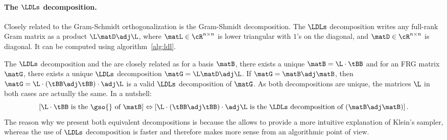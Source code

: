\paragraph{The $\LDLs$ decomposition.} Closely related to the Gram-Schmidt orthogonalization is the Gram-Shmidt decomposition. The $\LDLs$ decomposition writes any full-rank Gram matrix as a product $\L \matD \adj\L$, where $\matL \in \cR^{n\times n}$ is lower triangular with $1$'s on the diagonal, and $\matD \in \cR^{n\times n}$ is diagonal. It can be computed using algorithm~\ref{alg:ldl}.


 The $\LDLs$ decomposition and the \gso{} are closely related as for a basis $\matB$, there exists a unique \gso{} $\matB = \L \cdot \tBB$ and for an FRG matrix $\matG$, there exists a unique $\LDLs$ decomposition $\matG = \L  \matD  \adj\L$. If $\matG = \matB \adj \matB$, then $\matG = \L \cdot (\tBB \adj \tBB) \cdot \adj\L$ is a valid $\LDLs$ decomposition of $\matG$. As both decompositions are unique, the matrices $\L$ in both cases are actually the same. In a nutshell:
\begin{equation}
 \left[\L\cdot\tBB \text{ is the \gso{} of } \matB \right]
  \Leftrightarrow  \left[ \L \cdot (\tBB\adj \tBB) \cdot \adj\L  \text{ is the $\LDLs$ decomposition of }(\matB\adj \matB)\right].
\end{equation}
The reason why we present both equivalent decompositions is because the \gso{} allows to provide a more intuitive explanation of Klein's sampler, whereas the use of $\LDLs$ decomposition is faster and therefore makes more sense from an algorithmic point of view.

